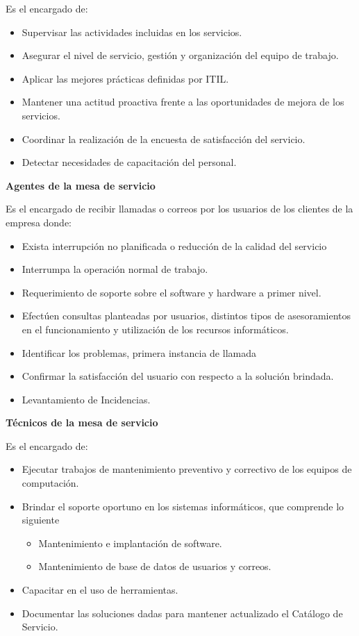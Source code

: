 Es el encargado de:
\begin{itemize}
\item Supervisar las actividades incluidas en los servicios.
\item Asegurar el nivel de servicio, gestión y organización del equipo de trabajo.
\item Aplicar las mejores prácticas definidas por ITIL. 
\item Mantener una actitud proactiva frente a las oportunidades de mejora de los servicios.
\item Coordinar la realización de la encuesta de satisfacción del servicio.
\item Detectar necesidades de capacitación del personal.

\end{itemize}
\textbf{Agentes de la mesa de servicio}

Es el encargado de recibir llamadas o correos por los usuarios de los clientes de la empresa donde:


\begin{itemize}
\item Exista interrupción no planificada o reducción de la calidad del servicio
\item Interrumpa la operación normal de trabajo.
\item Requerimiento de soporte sobre el software y hardware a primer nivel.
\item Efectúen consultas planteadas por usuarios, distintos tipos de asesoramientos en el funcionamiento y utilización de los recursos informáticos.
\item Identificar los problemas, primera instancia de llamada 
\item Confirmar la satisfacción del usuario con respecto a la solución brindada.
\item Levantamiento de Incidencias.

\end{itemize}
\textbf{Técnicos de la mesa de servicio}

Es el encargado de:
\begin{itemize}
	\item Ejecutar trabajos de mantenimiento preventivo y correctivo de los equipos de computación.
	\item Brindar el soporte oportuno en los sistemas informáticos, que comprende lo siguiente
	\begin{itemize}
			\item Mantenimiento e implantación de software.
		\item Mantenimiento de base de datos de usuarios y correos.
		
	\end{itemize}

	\item Capacitar en el uso de herramientas.
	\item Documentar las soluciones dadas para mantener actualizado el Catálogo de Servicio.
	
\end{itemize}


